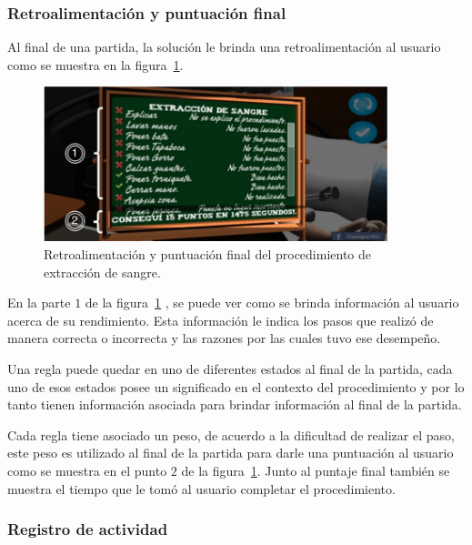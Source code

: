 \subsubsection{Retroalimentación y puntuación final}
\label{sec:puntuacion_hemocultivo}

Al final de una partida, la solución le brinda una retroalimentación al 
usuario como se muestra en la figura~\ref{fig:hemocultivo_retroalimentacion}.

\begin{figure}[H]
\centering 
\includegraphics[width=10cm]{solucion/images/hemocultivo_retroalimentacion.jpg}
\caption{Retroalimentación y puntuación final del procedimiento de extracción de sangre.}
\label{fig:hemocultivo_retroalimentacion}
\end{figure}

En la parte $1$ de la figura~\ref{fig:hemocultivo_retroalimentacion} , se puede ver 
como se brinda información al  usuario acerca de su rendimiento. Esta información le 
indica los pasos que realizó de manera correcta o incorrecta y las razones por las 
cuales tuvo ese desempeño.

Una regla puede quedar en uno de diferentes estados al final de la partida, cada
uno de esos estados posee un significado en el contexto del procedimiento y por
lo tanto tienen información asociada para brindar información al final de la
partida.

Cada regla tiene asociado un peso, de acuerdo a la dificultad de realizar el
paso, este peso es utilizado al final de la partida para darle una puntuación al
usuario como se muestra en el punto $2$ de la
figura~\ref{fig:hemocultivo_retroalimentacion}. Junto al puntaje final también
se muestra el tiempo que le tomó al usuario completar el procedimiento.


\subsubsection{Registro de actividad}

